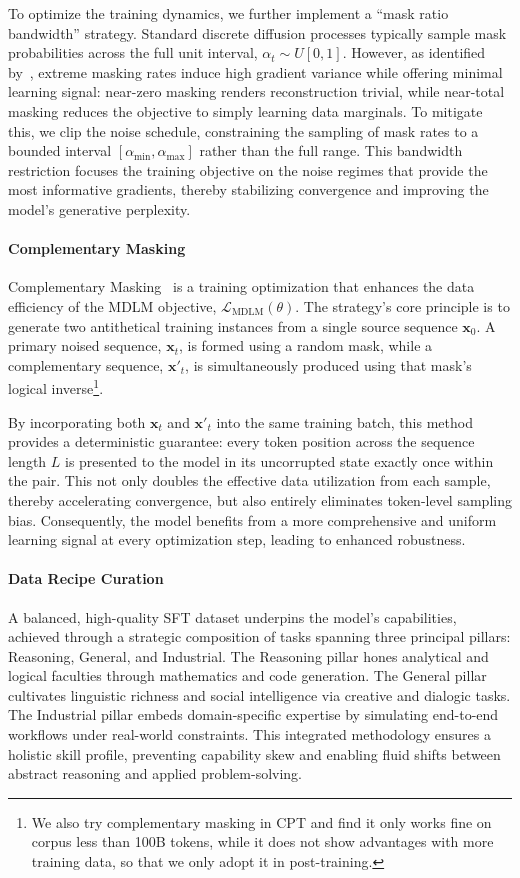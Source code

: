 To optimize the training dynamics, we further implement a ``mask ratio bandwidth'' strategy. Standard discrete diffusion processes typically sample mask probabilities across the full unit interval, $\alpha_{t} \sim U[0, 1]$. However, as identified by~\cite{Blockdiffusion2025}, extreme masking rates induce high gradient variance while offering minimal learning signal: near-zero masking renders reconstruction trivial, while near-total masking reduces the objective to simply learning data marginals. To mitigate this, we clip the noise schedule, constraining the sampling of mask rates to a bounded interval $[\alpha_{\min}, \alpha_{\max}]$ rather than the full range. This bandwidth restriction focuses the training objective on the noise regimes that provide the most informative gradients, thereby stabilizing convergence and improving the model's generative perplexity.

\paragraph{Complementary Masking}
Complementary Masking~\citep{li_lavida_2025} is a training optimization that enhances the data efficiency of the MDLM objective, $\mathcal{L}_{\text{MDLM}}(\theta)$. The strategy's core principle is to generate two antithetical training instances from a single source sequence $\bm{x}_0$. A primary noised sequence, $\bm{x}_t$, is formed using a random mask, while a complementary sequence, $\bm{x}'_t$, is simultaneously produced using that mask's logical inverse\footnote{We also try complementary masking in CPT and find it only works fine on corpus less than 100B tokens, while it does not show advantages with more training data, so that we only adopt it in post-training.}.

By incorporating both $\bm{x}_t$ and $\bm{x}'_t$ into the same training batch, this method provides a deterministic guarantee: every token position across the sequence length $L$ is presented to the model in its uncorrupted state exactly once within the pair. This not only doubles the effective data utilization from each sample, thereby accelerating convergence, but also entirely eliminates token-level sampling bias. Consequently, the model benefits from a more comprehensive and uniform learning signal at every optimization step, leading to enhanced robustness.

\paragraph{Data Recipe Curation}
A balanced, high-quality SFT dataset underpins the model's capabilities, achieved through a strategic composition of tasks spanning three principal pillars: Reasoning, General, and Industrial. The Reasoning pillar hones analytical and logical faculties through mathematics and code generation. The General pillar cultivates linguistic richness and social intelligence via creative and dialogic tasks. The Industrial pillar embeds domain-specific expertise by simulating end-to-end workflows under real-world constraints. This integrated methodology ensures a holistic skill profile, preventing capability skew and enabling fluid shifts between abstract reasoning and applied problem-solving.

